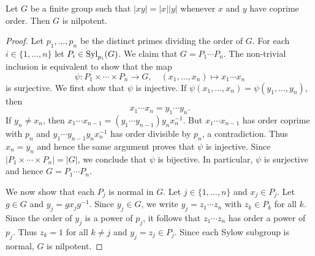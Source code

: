 

\begin{theorem}
	Let $G$ be a finite group such that $|xy|=|x||y|$ whenever $x$ and $y$ have coprime order. Then
	$G$ is nilpotent. 
\end{theorem}

\begin{proof}
	Let $p_1,\dots,p_n$ be the distinct primes dividing the order of $G$. For each 
	$i\in\{1,\dots,n\}$ let $P_i\in\mathrm{Syl}_{p_i}(G)$. We claim that 
	$G=P_1\cdots P_n$. The non-trivial inclusion is equivalent to show that the map
	\[
		\psi\colon P_1\times\cdots\times P_n\to G,\quad
		(x_1,\dots,x_n)\mapsto x_1\cdots x_n
	\]
	is surjective. We first show that $\psi$ is injective. If 
	$\psi(x_1,\dots,x_n)=\psi(y_1,\dots,y_n)$, then  
	\[
		x_1\cdots
	x_n=y_1\cdots y_n. 
	\]
	If $y_n\ne x_n$, then $x_1\cdots x_{n-1}=(y_1\cdots
	y_{n-1})y_nx_n^{-1}$. But $x_1\cdots x_{n-1}$ has order coprime with 
	$p_n$ and $y_1\cdots y_{n-1}y_nx_n^{-1}$ has order divisible by $p_n$, a contradiction. 
	Thus $x_n=y_n$ and hence the same argument proves that $\psi$ is injective. 
	Since $|P_1\times\cdots\times
	P_n|=|G|$, we conclude that $\psi$ is bijective. In particular, $\psi$ is surjective and hence 
	$G=P_1\cdots P_n$.

	We now show that each $P_j$ is normal in $G$.  Let $j\in\{1,\dots,n\}$ and 
	$x_j\in P_j$. Let $g\in G$ and $y_j=gx_jg^{-1}$.  Since $y_j\in G$,
	we write $y_j=z_1\cdots z_n$ with $z_k\in P_k$ for all $k$. Since the order of 
	$y_j$ is a power of $p_j$, it follows that $z_1\cdots
	z_n$ has order a power of $p_j$. Thus $z_k=1$ for all $k\ne j$ and 
	$y_j=z_j\in P_j$. Since each Sylow subgroup is normal, $G$ is nilpotent. 
\end{proof}


